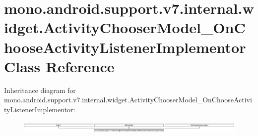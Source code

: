 \hypertarget{classmono_1_1android_1_1support_1_1v7_1_1internal_1_1widget_1_1ActivityChooserModel__OnChooseActivityListenerImplementor}{}\section{mono.\+android.\+support.\+v7.\+internal.\+widget.\+Activity\+Chooser\+Model\+\_\+\+On\+Choose\+Activity\+Listener\+Implementor Class Reference}
\label{classmono_1_1android_1_1support_1_1v7_1_1internal_1_1widget_1_1ActivityChooserModel__OnChooseActivityListenerImplementor}
Inheritance diagram for mono.\+android.\+support.\+v7.\+internal.\+widget.\+Activity\+Chooser\+Model\+\_\+\+On\+Choose\+Activity\+Listener\+Implementor\+:\begin{figure}[H]
\begin{center}
\leavevmode
\includegraphics[height=0.625349cm]{classmono_1_1android_1_1support_1_1v7_1_1internal_1_1widget_1_1ActivityChooserModel__OnChooseActivityListenerImplementor}
\end{center}
\end{figure}
